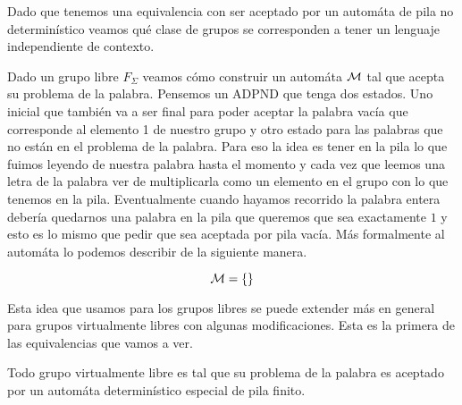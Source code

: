 \documentclass[tesis.tex]{subfiles}
\begin{document}
Dado que tenemos una equivalencia con ser aceptado por un automáta de pila no determinístico veamos qué clase de grupos se corresponden a tener un lenguaje independiente de contexto.

\begin{ej}
	Dado un grupo libre $F_\Sigma$ veamos cómo construir un automáta $\cal M$ tal que acepta su problema de la palabra. Pensemos un ADPND que tenga dos estados. Uno inicial que también va a ser final para poder aceptar la palabra vacía que corresponde al elemento 1 de nuestro grupo y otro estado para las palabras que no están en el problema de la palabra.
	Para eso la idea es tener en la pila lo que fuimos leyendo de nuestra palabra hasta el momento y cada vez que leemos una letra de la palabra ver de multiplicarla como un elemento en el grupo con lo que tenemos en la pila. Eventualmente cuando hayamos recorrido la palabra entera debería quedarnos una palabra en la pila que queremos que sea exactamente $1$ y esto es lo mismo que pedir que sea aceptada por pila vacía. Más formalmente al automáta lo podemos describir de la siguiente manera.
	
	\[
	{\cal M } = \{    \}
	\]
	
\end{ej}

Esta idea que usamos para los grupos libres se puede extender más en general para grupos virtualmente libres con algunas modificaciones. Esta es la primera de las equivalencias que vamos a ver.

\begin{teo}
	Todo grupo virtualmente libre es tal que su problema de la palabra es aceptado por un automáta determinístico especial de pila finito.
\end{teo}
\end{document}

